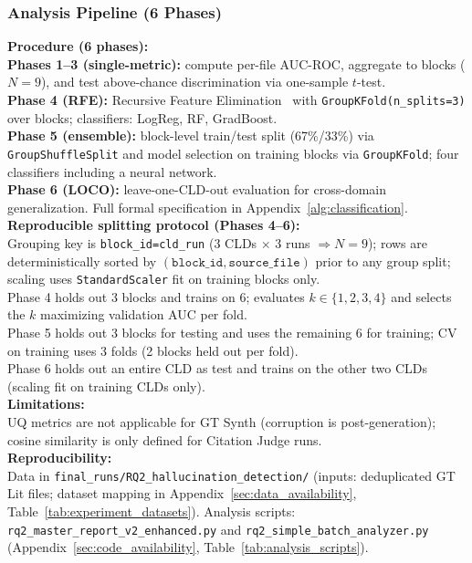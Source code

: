 \subsubsection{Analysis Pipeline (6 Phases)}
\label{sec:rq2_analysis}

\noindent\textbf{Procedure (6 phases):}\\
\textbf{Phases 1--3 (single-metric):} compute per-file AUC-ROC, aggregate to blocks ($N{=}9$), and test above-chance discrimination via one-sample $t$-test.\\
\textbf{Phase 4 (RFE):} Recursive Feature Elimination~\cite{pedregosa2011sklearn} with \texttt{GroupKFold(n\_splits=3)} over blocks; classifiers: LogReg, RF, GradBoost.\\
\textbf{Phase 5 (ensemble):} block-level train/test split (67\%/33\%) via \texttt{GroupShuffleSplit} and model selection on training blocks via \texttt{GroupKFold}; four classifiers including a neural network.\\
\textbf{Phase 6 (LOCO):} leave-one-CLD-out evaluation for cross-domain generalization. Full formal specification in Appendix~\ref{alg:classification}.\\
\textbf{Reproducible splitting protocol (Phases 4--6):}\\
Grouping key is \texttt{block\_id=cld\_run} (3 CLDs $\times$ 3 runs $\Rightarrow N{=}9$); rows are deterministically sorted by \((\texttt{block\_id}, \texttt{source\_file})\) prior to any group split; scaling uses \texttt{StandardScaler} fit on training blocks only.\\
Phase 4 holds out 3 blocks and trains on 6; evaluates \(k \in \{1,2,3,4\}\) and selects the \(k\) maximizing validation AUC per fold.\\
Phase 5 holds out 3 blocks for testing and uses the remaining 6 for training; CV on training uses 3 folds (2 blocks held out per fold).\\
Phase 6 holds out an entire CLD as test and trains on the other two CLDs (scaling fit on training CLDs only).\\
\textbf{Limitations:}\\
UQ metrics are not applicable for GT Synth (corruption is post-generation); cosine similarity is only defined for Citation Judge runs.\\
\textbf{Reproducibility:}\\
Data in \texttt{final\_runs/RQ2\_hallucination\_detection/} (inputs: deduplicated GT Lit files; dataset mapping in Appendix~\ref{sec:data_availability}, Table~\ref{tab:experiment_datasets}). Analysis scripts: \texttt{rq2\_master\_report\_v2\_enhanced.py} and \texttt{rq2\_simple\_batch\_analyzer.py} (Appendix~\ref{sec:code_availability}, Table~\ref{tab:analysis_scripts}).
    
